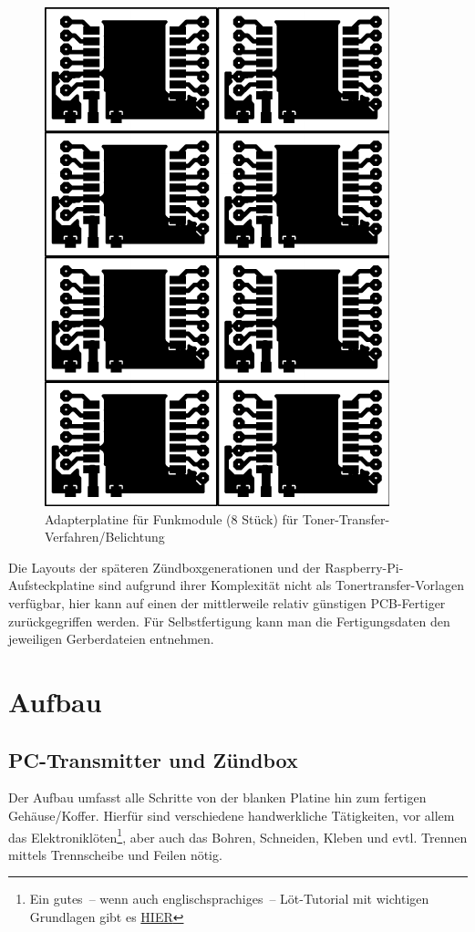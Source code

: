 \documentclass[paper=a4, parskip, numbers=noenddot, toc=listof, headsepline]{scrbook}
\begin{document}
		\begin{figure}
			\centering
			\includegraphics[scale=1]{Bilder/rfm-dil-70x100}
			\caption{Adapterplatine für Funkmodule (8 Stück) für Toner-Transfer-Verfahren/Belichtung}
			\label{fig:rfmprint}
		\end{figure}

		Die Layouts der späteren Zündboxgenerationen und der Raspberry-Pi-Aufsteckplatine sind aufgrund ihrer Komplexität nicht als Tonertransfer-Vorlagen verfügbar, hier kann auf einen der mittlerweile relativ günstigen PCB-Fertiger zurückgegriffen werden. Für Selbstfertigung kann man die Fertigungsdaten den jeweiligen Gerberdateien entnehmen.

	\chapter{Aufbau}

		\section{PC-Transmitter und Zündbox}

			Der Aufbau umfasst alle Schritte von der blanken Platine hin zum fertigen Gehäuse/Koffer. Hierfür sind verschiedene handwerkliche Tätigkeiten, vor allem das Elektroniklöten\footnote{Ein gutes~-- wenn auch englischsprachiges~-- Löt-Tutorial mit wichtigen Grundlagen gibt es \href{https://www.youtube.com/watch?v=I_NU2ruzyc4}{HIER}}, aber auch das Bohren, Schneiden, Kleben und evtl. Trennen mittels Trennscheibe und Feilen nötig.
\end{document}

